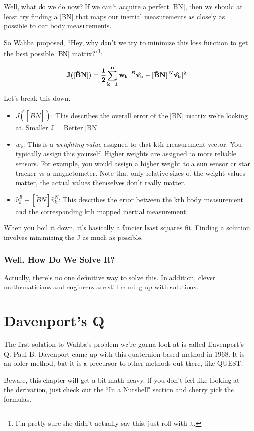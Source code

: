 \documentclass[a4paper,14pt]{extreport}
\newcommand{\vk}[1]{\prescript{#1}{}{\hat{v_k}}}
\begin{document}
Well, what do we do now? If we can't acquire a perfect [BN], then we should at least try finding a [BN] that maps our inertial measurements as closely as possible to our body measurements. 

So Wahba proposed, ``Hey, why don't we try to minimize this loss function to get the best possible [BN] matrix?"\footnote{I'm pretty sure she didn't actually say this, just roll with it.}:

\[
\mathbf{
J([\tilde{B}N]) = \dfrac{1}{2} \sum^n_{k=1} w_k |\vk{B} - [\tilde{B}N]\vk{N}|^2}
\]

Let's break this down.
\begin{itemize}
\item{$J([\tilde{B}N])$: This describes the overall error of the [BN] matrix we're looking at. Smaller J = Better [BN].
}
\item{$w_k$: This is a \emph{weighting value} assigned to that kth measurement vector. You typically assign this yourself. Higher weights are assigned to more reliable sensors. For example, you would assign a higher weight to a sun sensor or star tracker vs a magnetometer. Note that only relative sizes of the weight values matter, the actual values themselves don't really matter.
}
\item{$\hat{v}_k^B - [\tilde{B}N]\hat{v}_k^N$: This describes the error between the kth body measurement and the corresponding kth mapped inertial measurement.}
\end{itemize}

When you boil it down, it's basically a fancier least squares fit. Finding a solution involves minimizing the J as much as possible.

\subsection{Well, How Do We Solve It?}
Actually, there's no one definitive way to solve this. In addition, clever mathematicians and engineers are still coming up with solutions.
\chapter{Davenport's Q}
The first solution to Wahba's problem we're gonna look at is called Davenport's Q. Paul B. Davenport came up with this quaternion based method in 1968. It is an older method, but it is a precursor to other methods out there, like QUEST. 

Beware, this chapter will get a bit math heavy. If you don't feel like looking at the derivation, just check out the ``In a Nutshell" section and cherry pick the formulas.
\end{document}
